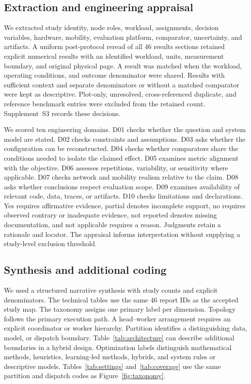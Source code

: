 \documentclass[pdflatex,sn-vancouver-num]{sn-jnl}
\begin{document}
\subsection{Extraction and engineering appraisal}
We extracted study identity, node roles, workload, assignments, decision variables, hardware, mobility, evaluation platform, comparator, uncertainty, and artifacts. A uniform post-protocol reread of all 46 results sections retained explicit numerical results with an identified workload, units, measurement boundary, and original physical page. A result was matched when the workload, operating conditions, and outcome denominator were shared. Results with sufficient context and separate denominators or without a matched comparator were kept as descriptive. Plot-only, unresolved, cross-referenced duplicate, and reference benchmark entries were excluded from the retained count. Supplement~S3 records these decisions.

We scored ten engineering domains. D01 checks whether the question and system model are stated. D02 checks constraints and assumptions. D03 asks whether the configuration can be reconstructed. D04 checks whether comparators share the conditions needed to isolate the claimed effect. D05 examines metric alignment with the objective. D06 assesses repetitions, variability, or sensitivity where applicable. D07 checks network and mobility realism relative to the claim. D08 asks whether conclusions respect evaluation scope. D09 examines availability of relevant code, data, traces, or artifacts. D10 checks limitations and declarations. Yes requires affirmative evidence, partial denotes incomplete support, no requires observed contrary or inadequate evidence, not reported denotes missing documentation, and not applicable requires a reason. Judgments retain a rationale and locator. The appraisal informs interpretation without supplying a study-level exclusion threshold.

\subsection{Synthesis and additional coding}
We used a structured narrative synthesis with study counts and explicit denominators. The technical tables use the same 46 report IDs as the accepted study map. The taxonomy assigns one primary label per dimension. Topology follows the primary execution path. A head--worker arrangement requires an explicit coordinator or worker hierarchy. Partition identifies a distinguishing data, model, or dispatch boundary. Table~\ref{tab:architecture} can describe additional boundaries in a hybrid design. Optimization labels distinguish mathematical methods, heuristics, learning-led methods, hybrids, and system rules or descriptive models. Tables~\ref{tab:settings} and~\ref{tab:coverage} use the same partition and dispatch codes as Figure~\ref{fig:taxonomy}.
\end{document}
